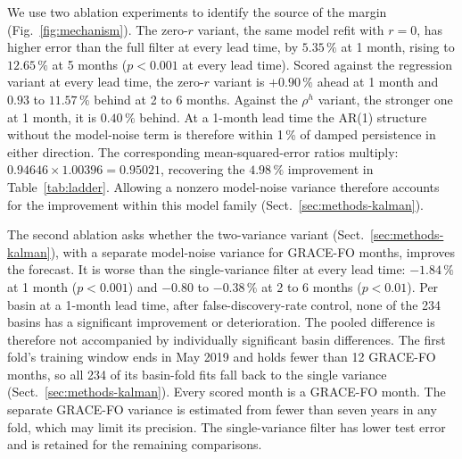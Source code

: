 \documentclass[hess, manuscript]{copernicus}
\begin{document}
We use two ablation experiments to identify the source of the margin (Fig.~\ref{fig:mechanism}). The
zero-$r$ variant, the same model refit with $r = 0$, has higher error than
the full filter at every lead time, by
$5.35\,\%$ at 1 month, rising to $12.65\,\%$ at 5 months ($p < 0.001$
at every lead time). Scored against the regression variant at every lead
time, the zero-$r$ variant is
$+0.90\,\%$ ahead at 1 month and $0.93$ to $11.57\,\%$ behind at 2 to 6
months. Against the $\rho^{h}$ variant, the stronger one at 1 month, it is
$0.40\,\%$ behind. At a 1-month lead time the AR(1) structure without the
model-noise term is therefore within 1\,\% of damped persistence in either
direction. The corresponding mean-squared-error ratios multiply:
$0.94646 \times 1.00396 = 0.95021$, recovering the $4.98\,\%$
improvement in Table~\ref{tab:ladder}. Allowing a nonzero model-noise
variance therefore accounts for the improvement within this model family
(Sect.~\ref{sec:methods-kalman}).

The second ablation asks whether the two-variance variant
(Sect.~\ref{sec:methods-kalman}), with a separate model-noise variance for
GRACE-FO months, improves the forecast. It is worse than the
single-variance filter at every lead time:
$-1.84\,\%$ at 1 month ($p < 0.001$) and $-0.80$ to $-0.38\,\%$ at 2 to
6 months ($p < 0.01$). Per basin at a 1-month lead time, after
false-discovery-rate control, none of the 234 basins has a significant
improvement or deterioration. The pooled difference is therefore not
accompanied by individually significant basin differences.
The first fold's training window ends in May 2019 and holds fewer than
12 GRACE-FO months, so all 234 of its basin-fold fits fall back to the
single variance (Sect.~\ref{sec:methods-kalman}).
Every scored month is a GRACE-FO month. The separate GRACE-FO variance is
estimated from fewer than seven years in any fold, which may limit its
precision. The single-variance filter has lower test error and is retained
for the remaining comparisons.
\end{document}
